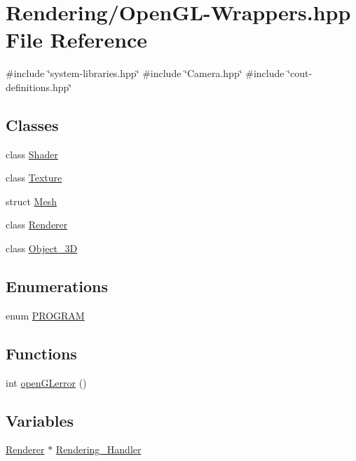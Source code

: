 \hypertarget{OpenGL-Wrappers_8hpp}{}\section{Rendering/\+Open\+G\+L-\/\+Wrappers.hpp File Reference}
\label{OpenGL-Wrappers_8hpp}
{\ttfamily \#include \char`\"{}system-\/libraries.\+hpp\char`\"{}}\newline
{\ttfamily \#include \char`\"{}Camera.\+hpp\char`\"{}}\newline
{\ttfamily \#include \char`\"{}cout-\/definitions.\+hpp\char`\"{}}\newline
\subsection*{Classes}
\begin{DoxyCompactItemize}
\item 
class \mbox{\hyperlink{classShader}{Shader}}
\item 
class \mbox{\hyperlink{classTexture}{Texture}}
\item 
struct \mbox{\hyperlink{structMesh}{Mesh}}
\item 
class \mbox{\hyperlink{classRenderer}{Renderer}}
\item 
class \mbox{\hyperlink{classObject__3D}{Object\+\_\+3D}}
\end{DoxyCompactItemize}
\subsection*{Enumerations}
\begin{DoxyCompactItemize}
\item 
enum \mbox{\hyperlink{OpenGL-Wrappers_8hpp_a567e6cb5b1eb395b3bce74667420d5ea}{P\+R\+O\+G\+R\+AM}} 
\end{DoxyCompactItemize}
\subsection*{Functions}
\begin{DoxyCompactItemize}
\item 
int \mbox{\hyperlink{OpenGL-Wrappers_8hpp_a2008ec7e2e49a51a3d3f0091cf96bc55}{open\+G\+Lerror}} ()
\end{DoxyCompactItemize}
\subsection*{Variables}
\begin{DoxyCompactItemize}
\item 
\mbox{\hyperlink{classRenderer}{Renderer}} $\ast$ \mbox{\hyperlink{OpenGL-Wrappers_8hpp_a21679bfe3ff6515d046879b080ac8ca9}{Rendering\+\_\+\+Handler}}
\end{DoxyCompactItemize}


